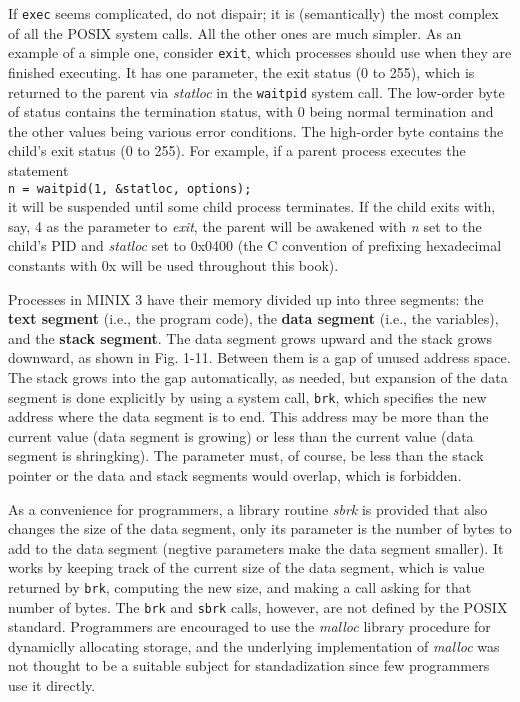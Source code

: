 \documentclass{book}
\newcommand {\kw}  [1] {\textbf{#1}}
\newcommand {\sys} [1] {\textsl{#1}}
\newcommand {\cmd} [1] {\texttt{#1}}
\begin{document}
If \cmd{exec} seems complicated, do not dispair; it is (semantically) the most complex of all the POSIX system calls.
All the other ones are much simpler.
As an example of a simple one, consider \cmd{exit}, which processes should use when they are finished executing.
It has one parameter, the exit status (0 to 255), which is returned to the parent via \sys{statloc} in the \cmd{waitpid} system call.
The low-order byte of status contains the termination status, with 0 being normal termination and the other values being various error conditions.
The high-order byte contains the child's exit status (0 to 255).
For example, if a parent process executes the statement\\
\cmd{n = waitpid(1, \&statloc, options);}\\
it will be suspended until some child process terminates.
If the child exits with, say, 4 as the parameter to \sys{exit}, the parent will be awakened with \sys{n} set to the child's PID 
and \sys{statloc} set to 0x0400 (the C convention of prefixing hexadecimal constants with 0x will be used throughout this book).

Processes in MINIX 3 have their memory divided up into three segments: the \kw{text segment} (i.e., the program code),
the \kw{data segment} (i.e., the variables), and the \kw{stack segment}.
The data segment grows upward and the stack grows downward, as shown in Fig. 1-11.
Between them is a gap of unused address space.
The stack grows into the gap automatically, as needed, but expansion of the data segment is done explicitly by using a system call, 
\cmd{brk}, which specifies the new address where the data segment is to end.
This address may be more than the current value (data segment is growing) or less than the current value (data segment is shringking).
The parameter must, of course, be less than the stack pointer or the data and stack segments would overlap, which is forbidden.

As a convenience for programmers, a library routine \sys{sbrk} is provided that also changes the size of the data segment, 
only its parameter is the number of bytes to add to the data segment (negtive parameters make the data segment smaller).
It works by keeping track of the current size of the data segment, which is value returned by \cmd{brk}, 
computing the new size, and making a call asking for that number of bytes. 
The \cmd{brk} and \cmd{sbrk} calls, however, are not defined by the POSIX standard.
Programmers are encouraged to use the \sys{malloc} library procedure for dynamiclly allocating storage, 
and the underlying implementation of \sys{malloc} was not thought to be a suitable subject for standadization 
since few programmers use it directly.
\end{document}
